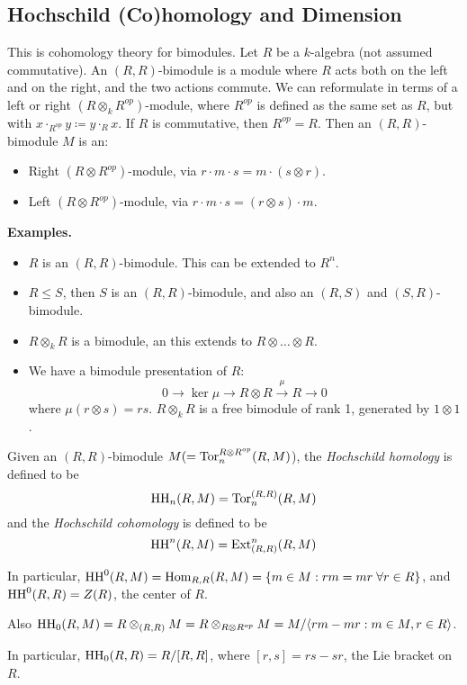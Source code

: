\documentclass[10pt,a4paper]{article}
\begin{document}
\subsection{Hochschild (Co)homology and Dimension}
This is cohomology theory for bimodules. Let $R$ be a $k$-algebra (not assumed commutative). An $(R,R)$-bimodule is a module where $R$ acts both on the left and on the right, and the two actions commute. We can reformulate in terms of a left or right $(R \otimes_k R^{op})$-module, where $R^{op}$ is defined as the same set as $R$, but with $x \cdot_{R^{op}} y \coloneqq y \cdot_R x$. If $R$ is commutative, then $R^{op} = R$. Then an $(R,R)$-bimodule $M$ is an:
\begin{itemize}
  \item Right $(R\otimes R^{op})$-module, via $r \cdot m \cdot s = m\cdot(s \otimes r)$.
  \item Left $(R \otimes R^{op})$-module, via $r \cdot m \cdot s = (r\otimes s) \cdot m$.
\end{itemize}
\textbf{Examples.}
\begin{itemize}
  \item $R$ is an $(R,R)$-bimodule. This can be extended to $R^n$.
  \item $R \leq S$, then $S$ is an $(R,R)$-bimodule, and also an $(R,S)$ and $(S,R)$-bimodule.
  \item $R \otimes_k R$ is a bimodule, an this extends to $R \otimes \ldots \otimes R$.
  \item We have a bimodule presentation of $R$:
  \[0 \to \ker \mu \to R \otimes R \xrightarrow{\mu} R \to 0\]
  where $\mu(r\otimes s) = rs$. $R \otimes_k R$ is a free bimodule of rank 1, generated by $1 \otimes 1$.
\end{itemize}
\begin{definition}
  Given an $(R,R)$-bimodule $M (= \operatorname{Tor}_n^{R\otimes R^{op}}(R,M)$), the \emph{Hochschild homology} is defined to be
  \[\operatorname{HH}_n(R, M) = \operatorname{Tor}_n^{(R,R)}(R,M)\]
  and the \emph{Hochschild cohomology} is defined to be
  \[\operatorname{HH}^n(R, M) = \operatorname{Ext}_{(R,R)}^n(R,M)\]
\end{definition}
In particular, $\HH^0(R,M) = \Hom_{R,R}(R,M) = \{m \in M: rm = mr \forall r \in R\}$, and $\operatorname{HH}^0(R,R) = Z(R)$, the center of $R$.

Also $\operatorname{HH}_0(R, M) = R \otimes_{(R,R)} M = R \otimes_{R\otimes R^{op}} M = M/\langle rm-mr: m \in M, r \in R \rangle$.

In particular, $\operatorname{HH}_0(R,R) = R/[R,R]$, where $[r,s] =rs-sr$, the Lie bracket on $R$.
\end{document}
